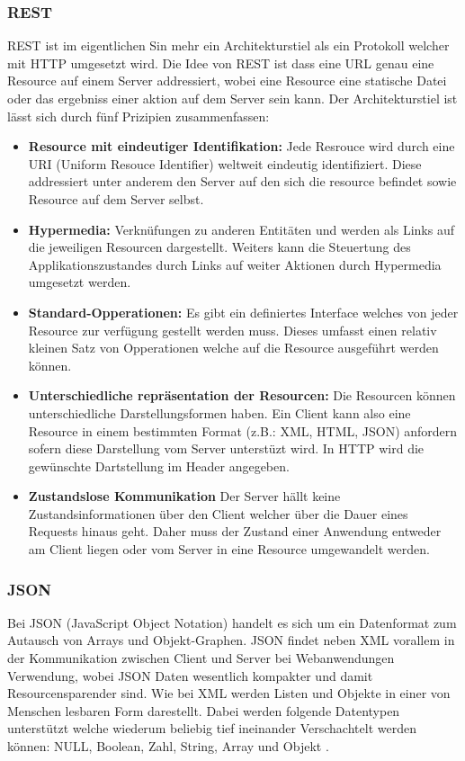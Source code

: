 \subsubsection{REST}
\label{sec:HTTP}
REST ist im eigentlichen Sin mehr ein Architekturstiel als ein Protokoll welcher mit HTTP umgesetzt wird.
Die Idee von REST ist dass eine URL genau eine Resource auf einem Server addressiert, 
wobei eine Resource eine statische Datei oder das ergebniss einer aktion auf dem Server sein kann.
Der Architekturstiel ist lässt sich durch fünf Prizipien zusammenfassen:
\begin{itemize}
	\item \textbf{Resource mit eindeutiger Identifikation:}
		Jede Resrouce wird durch eine URI (Uniform Resouce Identifier) weltweit eindeutig identifiziert.
		Diese addressiert unter anderem den Server auf den sich die resource befindet sowie Resource auf dem Server selbst.
	\item \textbf{Hypermedia:}
		Verknüfungen zu anderen Entitäten und werden als Links auf die jeweiligen Resourcen dargestellt.
		Weiters kann die Steuertung des Applikationszustandes durch Links auf weiter Aktionen durch Hypermedia umgesetzt werden.
	\item \textbf{Standard-Opperationen:}
		Es gibt ein definiertes Interface welches von jeder Resource zur verfügung gestellt werden muss.
		Dieses umfasst einen relativ kleinen Satz von Opperationen welche auf die Resource ausgeführt werden können.
	\item \textbf{Unterschiedliche repräsentation der Resourcen:}
		Die Resourcen können unterschiedliche Darstellungsformen haben.
		Ein Client kann also eine Resource in einem bestimmten Format (z.B.: XML, HTML, JSON) anfordern sofern diese Darstellung vom Server unterstüzt wird.
		In HTTP wird die gewünschte Dartstellung im Header angegeben.
	\item \textbf{Zustandslose Kommunikation}
		Der Server hällt keine Zustandsinformationen über den Client welcher über die Dauer eines Requests hinaus geht.
		Daher muss der Zustand einer Anwendung entweder am Client liegen oder vom Server in eine Resource umgewandelt werden.
\end{itemize}
\cite{rest}

\subsubsection{JSON}
\label{sec:JSON}
Bei JSON (JavaScript Object Notation) handelt es sich um ein Datenformat zum Autausch von Arrays und Objekt-Graphen.
JSON findet neben XML vorallem in der Kommunikation zwischen Client und Server bei Webanwendungen Verwendung, 
wobei JSON Daten wesentlich kompakter und damit Resourcensparender sind.
Wie bei XML werden Listen und Objekte in einer von Menschen lesbaren Form darestellt.
Dabei werden folgende Datentypen unterstützt welche wiederum beliebig tief ineinander Verschachtelt werden können: NULL, Boolean, Zahl, String, Array und Objekt \cite{ajax}.


